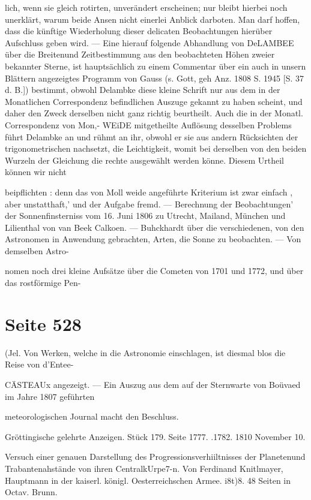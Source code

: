 \documentclass[10pt,a4paper]{article}
\begin{document}
lich, wenn sie gleich rotirten, unverändert erscheinen; nur bleibt hierbei noch unerklärt, warum beide Ansen nicht einerlei Anblick darboten. Man darf hoffen, dass die künftige Wiederholung dieser delicaten Beobachtungen hierüber Aufschluss geben wird. — Eine hierauf folgende Abhandlung von DeLAMBEE über die Breitenund Zeitbestimmung aus den beobachteten Höhen zweier bekannter Sterne, ist hauptsächlich zu einem Commentar über ein auch in unsern Blättern angezeigtes Programm von Gauss (s. Gott, geh Anz. 1808 S. 1945 [S. 37 d. B.]) bestimmt, obwohl Delambke diese kleine Schrift nur aus dem in der Monatlichen Correspondenz befindlichen Auszuge gekannt zu haben scheint, und daher den Zweck derselben nicht ganz richtig beurtheilt. Auch die in der Monatl. Correspondenz von Mon,- WEiDE mitgetheilte Auflösung desselben Problems führt Delambke an und rühmt an ihr, obwohl er sie aus andern Rücksichten der trigonometrischen nachsetzt, die Leichtigkeit, womit bei derselben von den beiden Wurzeln der Gleichung die rechte ausgewählt werden könne. Diesem Urtheil können wir nicht

beipflichten : denn das von Moll weide angeführte Kriterium ist zwar einfach , aber unstatthaft,' und der Aufgabe fremd. — Berechnung der Beobachtungen' der Sonnenfinsterniss vom 16. Juni 1806 zu Utrecht, Mailand, München und Lilienthal von van Beek Calkoen. — Buhckhardt über die verschiedenen, von den Astronomen in Anwendung gebrachten, Arten, die Sonne zu beobachten. — Von demselben Astro-

nomen noch drei kleine Aufsätze über die Cometen von 1701 und 1772, und über das rostförmige Pen-


\newpage
\section*{Seite 528}
(Jel. Von Werken, welche in die Astronomie einschlagen, ist diesmal blos die Reise von d'Entee-

CÄSTEAUx angezeigt. — Ein Auszug aus dem auf der Sternwarte von Boüvaed im Jahre 1807 geführten

meteorologischen Journal macht den Beschluss.

Gröttingische gelehrte Anzeigen. Stück 179. Seite 1777. .1782. 1810 November 10.

Versuch einer genauen Darstellung des Progressionsverhiiltnisses der Planetenund Trabantenahstände von ihren CentralkUrpe7-n. Von Ferdinand Knitlmayer, Hauptmann in der kaiserl. königl. Oesterreichschen Armee. i8t)8. 48 Seiten in Octav. Brunn.
\end{document}
